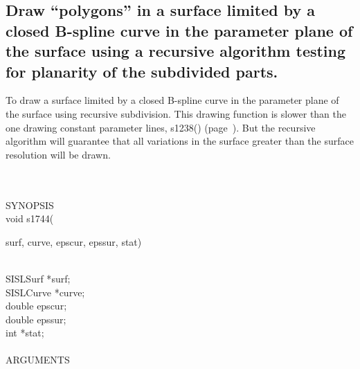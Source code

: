 \subsection{Draw ``polygons'' in a surface limited by a closed B-spline 
curve in the parameter plane of the surface
using a recursive algorithm testing for 
planarity of the subdivided parts.}
\begin{minipg1}
To draw a surface limited by a closed B-spline 
curve in the parameter plane of the surface
using recursive subdivision.
This drawing function is slower than the one drawing constant parameter
lines, s1238() (page~\pageref{s1238}). But the recursive algorithm
will guarantee that all variations in the surface greater
than the surface resolution will be drawn.
\end{minipg1} \\ \\
SYNOPSIS\\
	\>void s1744(\begin{minipg3}
		{\fov surf}, {\fov curve}, {\fov epscur}, {\fov epssur}, {\fov stat})
		\end{minipg3}\\[0.3ex]
		\>\>	SISLSurf	\> 	*{\fov surf};\\
		\>\>	SISLCurve	\>	*{\fov curve};\\
		\>\>	double	\>	{\fov epscur};\\
		\>\>	double	\>	{\fov epssur};\\
		\>\>	int 	\>	*{\fov stat};\\
\\
ARGUMENTS\\

